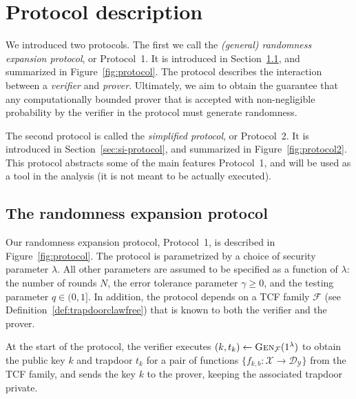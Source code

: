 \documentclass[11pt]{article}
\theoremstyle{remark}
\theoremstyle{definition}
\newcommand{\mD}{\ensuremath{\mathcal{D}}}
\newcommand{\mF}{\ensuremath{\mathcal{F}}}
\newcommand{\mX}{\ensuremath{\mathcal{X}}}
\newcommand{\mY}{\ensuremath{\mathcal{Y}}}
\newcommand{\Gen}{\textsc{Gen}}
\begin{document}


\section{Protocol description}
\label{sec:protocol}

We introduced two protocols. The first we call the \emph{(general) randomness expansion protocol}, or Protocol~1. It is introduced in Section~\ref{sec:re-protocol}, and summarized in Figure~\ref{fig:protocol}. The protocol describes the interaction between a \emph{verifier} and \emph{prover}. Ultimately, we aim to obtain the guarantee that any computationally bounded prover that is accepted with non-negligible probability by the verifier in the protocol must generate randomness. 

The second protocol is called the \emph{simplified protocol}, or Protocol~2. It is introduced in Section~\ref{sec:si-protocol}, and summarized in Figure~\ref{fig:protocol2}. This protocol abstracts some of the main features Protocol~1, and will be used as a tool in the analysis (it is not meant to be actually executed).  


\subsection{The randomness expansion protocol}
\label{sec:re-protocol}

Our randomness expansion protocol, Protocol~1, is described in Figure~\ref{fig:protocol}. The protocol is parametrized by a choice of security parameter $\lambda$. All other parameters are assumed to be specified as a function of $\lambda$: the number of rounds $N$, the error tolerance parameter $\gamma \geq 0$, and the testing parameter $q\in (0,1]$. In addition, the protocol depends on a TCF family $\mathcal{F}$ (see Definition~\ref{def:trapdoorclawfree}) that is known to both the verifier and the prover.

At the start of the protocol, the verifier executes $(k,t_k)\leftarrow \Gen_\mF(1^\lambda)$ to obtain the public key $k$ and trapdoor $t_k$ for a pair of functions $\{f_{k,b}:\mX\to \mD_\mY\}$ from the TCF family, and sends the key $k$ to the prover, keeping the associated trapdoor private. 
\end{document}

